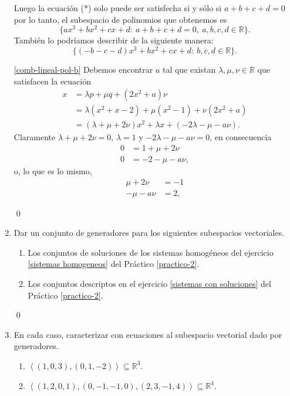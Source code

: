 \begin{enumerate}[resume, topsep=6pt, itemsep=.4cm]
    Luego la ecuación (*) solo puede ser satisfecha si y sólo si $a+b+c+d  =0$ por lo tanto, el subespacio de polinomios que obtenemos es
    \begin{equation*}
        \{a x^3 + bx^2 + cx + d: \ a+b+c+d = 0, \ a,b,c,d\in\mathbb{R}\}.
    \end{equation*}
    También lo podríamos describir de la siguiente manera: 
    \begin{equation*}
        \{(-b-c-d) x^3 + bx^2 + cx + d: \ b,c,d\in\mathbb{R}\}.
    \end{equation*}

    \ref{comb-lineal-pol-b} Debemos encontrar $a$ tal que existan $\lambda,\mu,\nu\in\mathbb{R}$ que satisfacen la ecuación
    \begin{align*}
        x&=\lambda p +\mu q +(2x^2+a) \nu \\
        &= \lambda(x^2+x-2)+\mu(x^2-1)+\nu(2x^2+a)\\
        &= (\lambda+\mu+2\nu)x^2+\lambda x+(-2\lambda-\mu-a\nu).
    \end{align*}
    Claramente $\lambda+\mu+2\nu=0$, $\lambda=1$  y $-2\lambda-\mu-a\nu=0$,  en consecuencia
    \begin{align*}
        0&=1+\mu+2\nu\\
        0&=-2-\mu-a\nu,
    \end{align*}
    o, lo que es lo mismo, 
    \begin{align*}
        \mu+2\nu&=-1\\
        -\mu-a\nu&=2,
    \end{align*}

    \qed     
    
    \item\label{practicos anteriores} Dar un conjunto de generadores para los siguientes subespacios vectoriales.
    \begin{enumerate}
    \item Los conjuntos de soluciones de los sistemas homogéneos del ejercicio \ref{sistemas homogeneos} del Práctico \ref{practico-2}.
    \item Los conjuntos descriptos en el ejercicio \ref{sistemas con soluciones} del Práctico  \ref{practico-2}.
    \end{enumerate}
    
    \rta 

    \qed     
    
    \item\label{caracterizar}  En cada caso, caracterizar con ecuaciones al subespacio vectorial dado por generadores.
    \begin{enumerate}
    \item ${\left\langle(1,0,3),(0,1,-2)\right\rangle}\subseteq \mathbb{R}^3$.
    \item ${\left\langle(1,2,0,1),(0,-1,-1,0),(2,3,-1,4)\right\rangle}\subseteq \mathbb{R}^4$.
    \end{enumerate}
    

\end{enumerate}

